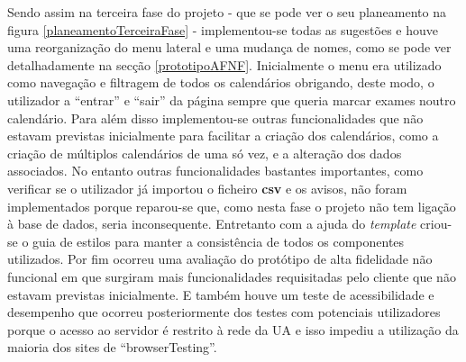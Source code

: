 \documentclass[11pt, twoside]{report}
\begin{document}
 	Sendo assim na terceira fase do projeto - que se pode ver o seu planeamento na figura \ref{planeamentoTerceiraFase} - implementou-se todas as sugestões e houve uma reorganização do menu lateral e uma mudança de nomes, como se pode ver detalhadamente na secção \ref{prototipoAFNF}.
 	Inicialmente o menu era utilizado como navegação e filtragem de todos os calendários obrigando, deste modo, o utilizador a ``entrar'' e ``sair'' da página sempre que queria marcar exames noutro calendário.
 	Para além disso implementou-se outras funcionalidades que não estavam previstas inicialmente para facilitar a criação dos calendários, como a criação de múltiplos calendários de uma só vez, e a alteração dos dados associados.
 	No entanto outras funcionalidades bastantes importantes, como verificar se o utilizador já importou o ficheiro \textbf{csv} e os avisos, não foram implementados porque reparou-se que, como nesta fase o projeto não tem ligação à base de dados, seria inconsequente.
 	Entretanto com a ajuda do \textit{template} criou-se o guia de estilos para manter a consistência de todos os componentes utilizados.
 	Por fim ocorreu uma avaliação do protótipo de alta fidelidade não funcional em que surgiram mais funcionalidades requisitadas pelo cliente que não estavam previstas inicialmente.
 	E também houve um teste de acessibilidade e desempenho que ocorreu posteriormente dos testes com potenciais utilizadores porque o acesso ao servidor é restrito à rede da UA e isso impediu a utilização da maioria dos sites de ``browserTesting''. 
\end{document}
